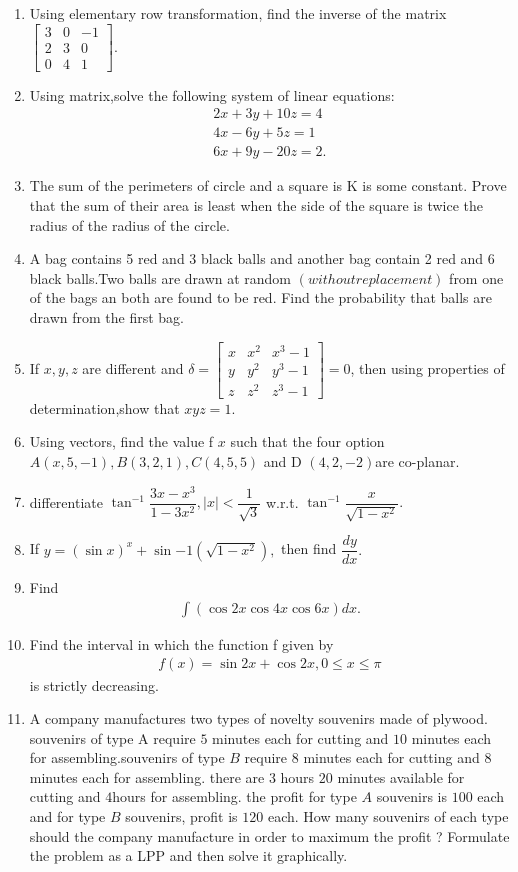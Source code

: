 \documentclass[12pt,-letter paper]{article}
\providecommand{\myvec}[1]{\ensuremath{\begin{bmatrix}#1\end{bmatrix}}}
\providecommand{\brak}[1]{\ensuremath{\left(#1\right)}}
\providecommand{\abs}[1]{\left\vert#1\right\vert}
\begin{document}
\begin{enumerate}
\item Using elementary row transformation, find the inverse of the matrix \myvec{3&0&-1\\2&3&0\\0&4&1}.
\item Using matrix,solve the following system of linear equations: \begin{align} 2x+3y+10z=4 \\4x-6y+5z=1\\ 6x+9y-20z=2.\end{align}
\item The sum of the perimeters of circle and a square is K is some constant. Prove that the sum of their area is least when the side of the square is twice the radius of the radius of the circle.
\item A bag contains 5 red and 3 black balls and another bag contain 2 red and 6 black balls.Two balls are drawn at random $\brak{without replacement}$ from one of the bags an both are found to be red. Find the probability that balls are drawn from the first bag.
\item If $x,y,z$ are different and $\delta =\myvec{x&x^2&x^3-1\\y&y^2&y^3-1\\z&z^2&z^3-1}=0$, then using properties of determination,show that $xyz=1$.
\item Using vectors, find the value f $x$ such that the four option $ A\brak{x,5,-1},B\brak{3,2,1},C \brak{4,5,5}$ and D $\brak{4,2,-2} $are co-planar.
\item differentiate $ \tan^{-1} \dfrac{3x-x^3}{1-3x^2},\abs{x}<\dfrac{1}{\sqrt{3}} $ w.r.t. $\tan^{-1}\dfrac{x}{\sqrt{1-x^2}}.$
\item If $ y=\brak{\sin x}^x+\sin{-1}\brak{\sqrt{1-x^2}},$ then find $\dfrac{dy}{dx}.$
\item Find
\begin{align}
\int\brak{\cos2x\cos4x\cos6x} dx. 
\end{align}
\item Find the interval in which the function f given by \begin{align}
f\brak{x}=\sin2x+\cos2x, 0\leq x\leq \pi \end{align} is strictly decreasing.
\item A company manufactures two types of novelty souvenirs made of plywood. souvenirs of type A require $5$ minutes each for cutting and $10$ minutes each for assembling.souvenirs of type $B$ require $8$ minutes each for cutting and $8$ minutes each for assembling. there are 3 hours $20$ minutes available for cutting and $4$hours for assembling. the profit for type $A$ souvenirs is \rupee$ 100$ each and for type $B$ souvenirs, profit is \rupee $120$ each. How many souvenirs of each type should the company manufacture in order to maximum the profit ? Formulate the problem as a LPP and then solve it graphically.

\end{enumerate}
\end{document}
